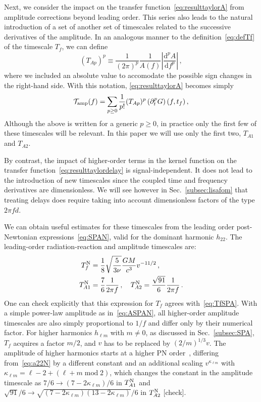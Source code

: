 \documentclass[aps,showpacs,twocolumn,
prd,superscriptaddress,nofootinbib]{revtex4-1}
\newcommand{\be}{\begin{equation}}
\newcommand{\ee}{\end{equation}}
\newcommand\ud{{\mathrm{d}}}
\newcommand\calT{{\mathcal{T}}}
\newcommand{\tf}{t_{f}}
\newcommand{\Tf}{T_{f}}
\newcommand{\SM}[1]{{\color{Red} #1}}
\begin{document}
Next, we consider the impact on the transfer function~\eqref{eq:resulttaylorA} from amplitude corrections beyond leading order. This series also leads to the natural introduction of a set of another set of timescales related to the successive derivatives of the amplitude. In an analogous manner to the definition~\eqref{eq:defTf} of the timescale $\Tf$, we can define
\be\label{eq:defTA}
	\left( T_{Ap} \right)^{p} \equiv \frac{1}{(2 \pi)^{p}} \frac{1}{A(f)} \left| \frac{\ud^{p} A}{\ud f^{p}} \right| \,,
\ee
where we included an absolute value to accomodate the possible sign changes in the right-hand side. With this notation, \eqref{eq:resulttaylorA} becomes simply
\be\label{eq:resultATA}
	\calT_{\rm amp}(f) = \sum\limits_{p\geq 0} \frac{1}{p!} (T_{Ap})^{p}  \left( \partial_{t}^{p} G \right) (f,\tf) \,,
\ee
Although the above is written for a generic $p\geq 0$, in practice only the first few of these timescales will be relevant. In this paper we will use only the first two, $T_{A1}$ and $T_{A2}$.

By contrast, the impact of higher-order terms in the kernel function on the transfer function~\eqref{eq:resulttaylordelay} is signal-independent. It does not lead to the introduction of new timescales since the coupled time and frequency derivatives are dimensionless. We will see however in Sec.~\ref{subsec:lisafom} that treating delays does require taking into account dimensionless factors of the type $2\pi f d$.

We can obtain useful estimates for these timescales from the leading order post-Newtonian expressions~\eqref{eq:SPAN}, valid for the dominant harmonic $h_{22}$. The leading-order radiation-reaction and amplitude timescales are:
\begin{subequations}\label{eq:timescalesN}
\begin{align}
	\Tf^{\rm N} &= \frac{1}{8} \sqrt{\frac{5}{3\nu}} \frac{G M}{c^{3}} v^{-11/2} \,, \label{eq:TfN}\\
	T_{A1}^{\rm N} &= \frac{7}{6} \frac{1}{2\pi f}\,, \quad T_{A2}^{\rm N} = \frac{\sqrt{91}}{6} \frac{1}{2\pi f} \,. \label{eq:TA1N-TA2N}
\end{align}
\end{subequations}
One can check explicitly that this expression for $\Tf$ agrees with~\eqref{eq:TfSPA}. With a simple power-law amplitude as in~\eqref{eq:ASPAN}, all higher-order amplitude timescales are also simply proportional to $1/f$ and differ only by their numerical factor. For higher harmonics $h_{\ell m}$ with $m\neq 0$, as discussed in Sec.~\ref{subsec:SPA}, $T_{f}$ acquires a factor $m/2$, and $v$ has to be replaced by $(2/m)^{1/3} v$. The amplitude of higher harmonics starts at a higher PN order~\cite{BlanchetLiving}, differing from~\eqref{eq:a22N} by a different constant and an additional scaling $v^{\kappa_{\ell m}}$ with $\kappa_{\ell m} = \ell - 2 + (\ell + m \; \mathrm{mod} \; 2)$, which changes the constant in the amplitude timescale as $7/6 \rightarrow (7-2\kappa_{\ell m})/6$ in $T_{A1}^{\rm N}$ and $\sqrt{91}/6 \rightarrow \sqrt{(7-2\kappa_{\ell m})(13-2\kappa_{\ell m})}/6$ in $T_{A2}^{\rm N}$ \SM{[check]}.
\end{document}

